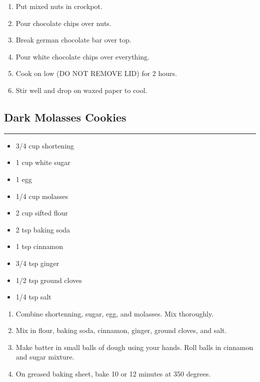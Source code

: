 \documentclass{article}
\begin{document}
\begin{enumerate}
    \item 
        Put mixed nuts in crockpot. 
    \item 
        Pour chocolate chips over nuts.
    \item 
        Break german chocolate bar over top.
    \item 
        Pour white chocolate chips over everything.
    \item 
        Cook on low (DO NOT REMOVE LID) for 2 hours.
    \item 
        Stir well and drop on waxed paper to cool.
\end{enumerate}
\newpage

\subsection{Dark Molasses Cookies} 
\noindent\rule[0.5ex]{\linewidth}{1pt}

\begin{framed}
\begin{itemize}
    \item 3/4 cup shortening
    \item 1 cup white sugar
    \item 1 egg
    \item 1/4 cup molasses
    \item 2 cup sifted flour
    \item 2 tsp baking soda
    \item 1 tsp cinnamon
    \item 3/4 tsp ginger
    \item 1/2 tsp ground cloves
    \item 1/4 tsp salt
\end{itemize}
\end{framed}

\begin{enumerate}
    \item 
        Combine shortenning, sugar, egg, and molasses. Mix thoroughly.
    \item 
        Mix in flour, baking soda, cinnamon, ginger, ground cloves, and salt.  
    \item 
        Make batter in small balls of dough using your hands. Roll balls in cinnamon and sugar mixture.
    \item 
        On greased baking sheet, bake 10 or 12 minutes at 350 degrees.
\end{enumerate}
\newpage
\end{document}
